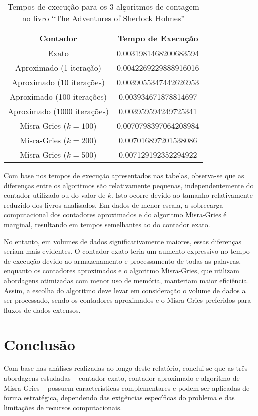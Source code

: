 \documentclass[shortpaper, portugues, times, mirror]{revdetua}
\begin{document}
\begin{table}[H]
\centering
\begin{tabular}{|c|c|}
\hline
\textbf{Contador}& \textbf{Tempo de Execução}\\ \hline
Exato& 0.0031981468200683594 \\ \hline
Aproximado (1 iteração)& 0.0042269229888916016 \\ \hline
Aproximado (10 iterações)& 0.0039055347442626953 \\ \hline
Aproximado (100 iterações)& 0.003934671878814697 \\ \hline
Aproximado (1000 iterações)& 0.003959594249725341 \\ \hline
Misra-Gries (\(k = 100\))& 0.0070798397064208984 \\ \hline
Misra-Gries (\(k = 200\))& 0.007016897201538086 \\ \hline
Misra-Gries (\(k = 500\))& 0.007129192352294922 \\ \hline
\end{tabular}
\caption{Tempos de execução para os 3 algoritmos de contagem no livro “The Adventures of Sherlock Holmes”}
\label{tab:accuracy}
\end{table}

Com base nos tempos de execução apresentados nas tabelas, observa-se que as diferenças entre os algoritmos são relativamente pequenas, independentemente do contador utilizado ou do valor de \(k\). Isto ocorre devido ao tamanho relativamente reduzido dos livros analisados. Em dados de menor escala, a sobrecarga computacional dos contadores aproximados e do algoritmo Misra-Gries é marginal, resultando em tempos semelhantes ao do contador exato.

No entanto, em volumes de dados significativamente maiores, essas diferenças seriam mais evidentes. O contador exato teria um aumento expressivo no tempo de execução devido ao armazenamento e processamento de todas as palavras, enquanto os contadores aproximados e o algoritmo Misra-Gries, que utilizam abordagens otimizadas com menor uso de memória, manteriam maior eficiência. Assim, a escolha do algoritmo deve levar em consideração o volume de dados a ser processado, sendo os contadores aproximados e o Misra-Gries preferidos para fluxos de dados extensos.

\section{Conclusão}

Com base nas análises realizadas ao longo deste relatório, conclui-se que as três abordagens estudadas – contador exato, contador aproximado e algoritmo de Misra-Gries – possuem características complementares e podem ser aplicadas de forma estratégica, dependendo das exigências específicas do problema e das limitações de recursos computacionais.
\end{document}

